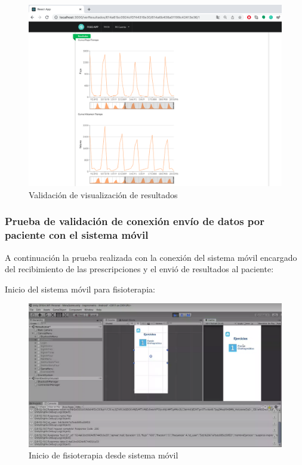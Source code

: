 \documentclass[12pt]{article}
\begin{document}
\begin{figure}[ht]
\centering
\includegraphics[scale=0.3]{imag/TEST8Graficas.png}
\caption{Validación de visualización de resultados }
\label{6}
\end{figure}
\FloatBarrier


\subsubsection{Prueba de validación de conexión envío de datos por paciente con el sistema móvil }

A continuación la prueba realizada con la conexión del sistema móvil encargado del recibimiento de las prescripciones y el envió de resultados al paciente: 

Inicio del sistema móvil para fisioterapia:

\begin{figure}[ht]
\centering
\includegraphics[scale=0.3]{imag/TESTseleccionejericiomobile.png}
\caption{Inicio de fisioterapia desde sistema móvil }
\label{6}
\end{figure}
\FloatBarrier
\end{document}
